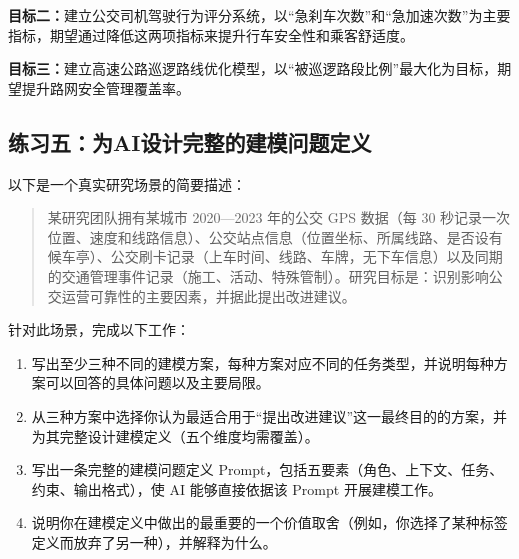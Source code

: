 \smallskip
\textbf{目标二：}建立公交司机驾驶行为评分系统，以“急刹车次数”和“急加速次数”为主要指标，期望通过降低这两项指标来提升行车安全性和乘客舒适度。

\smallskip
\textbf{目标三：}建立高速公路巡逻路线优化模型，以“被巡逻路段比例”最大化为目标，期望提升路网安全管理覆盖率。

\subsection*{练习五：为AI设计完整的建模问题定义}

以下是一个真实研究场景的简要描述：

\begin{quote}
某研究团队拥有某城市 2020—2023 年的公交 GPS 数据（每 30 秒记录一次位置、速度和线路信息）、公交站点信息（位置坐标、所属线路、是否设有候车亭）、公交刷卡记录（上车时间、线路、车牌，无下车信息）以及同期的交通管理事件记录（施工、活动、特殊管制）。研究目标是：识别影响公交运营可靠性的主要因素，并据此提出改进建议。
\end{quote}

针对此场景，完成以下工作：

\begin{enumerate}
  \item 写出至少三种不同的建模方案，每种方案对应不同的任务类型，并说明每种方案可以回答的具体问题以及主要局限。
  \item 从三种方案中选择你认为最适合用于“提出改进建议”这一最终目的的方案，并为其完整设计建模定义（五个维度均需覆盖）。
  \item 写出一条完整的建模问题定义 Prompt，包括五要素（角色、上下文、任务、约束、输出格式），使 AI 能够直接依据该 Prompt 开展建模工作。
  \item 说明你在建模定义中做出的最重要的一个价值取舍（例如，你选择了某种标签定义而放弃了另一种），并解释为什么。
\end{enumerate}





